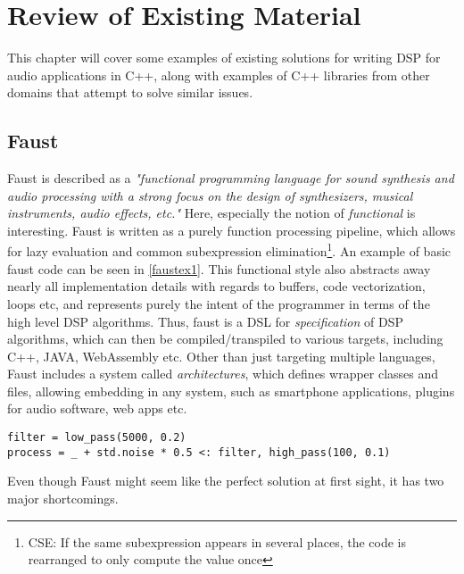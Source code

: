 \chapter{Review of Existing Material} \label{sec:review}


This chapter will cover some examples of existing solutions for writing DSP for audio applications in C++, along with examples of C++ libraries from other domains that attempt to solve similar issues.

\section{Faust}
Faust is described as a \emph{"functional programming language for sound synthesis and audio processing with a strong focus on the design of synthesizers, musical instruments, audio effects, etc."\autocite{faustwebsite}}
Here, especially the notion of \emph{functional} is interesting. Faust is written as a purely function processing pipeline, which allows for lazy evaluation and common subexpression elimination\footnote{CSE: If the same subexpression appears in several places, the code is rearranged to only compute the value once}. An example of basic faust code can be seen in \autoref{faustex1}.
This functional style also abstracts away nearly all implementation details with regards to buffers, code vectorization, loops etc, and represents purely the intent of the programmer in terms of the high level DSP algorithms. Thus, faust is a DSL for \emph{specification} of DSP algorithms, which can then be compiled/transpiled to various targets, including C++, JAVA, WebAssembly etc.
Other than just targeting multiple languages, Faust includes a system called \emph{architectures}, which defines wrapper classes and files, allowing embedding in any system, such as smartphone applications, plugins for audio software, web apps etc. 

\begin{lstlisting}[language=faust,label=faustex1,float,caption={
    Example faust code. Pass a mono signal in, add white noise scaled to 0.5, split the signal into two channels, and pass one channel through a low pass filter, and one through a high pass filter
}]
filter = low_pass(5000, 0.2)
process = _ + std.noise * 0.5 <: filter, high_pass(100, 0.1)
\end{lstlisting}

Even though Faust might seem like the perfect solution at first sight, it has two major shortcomings. 

